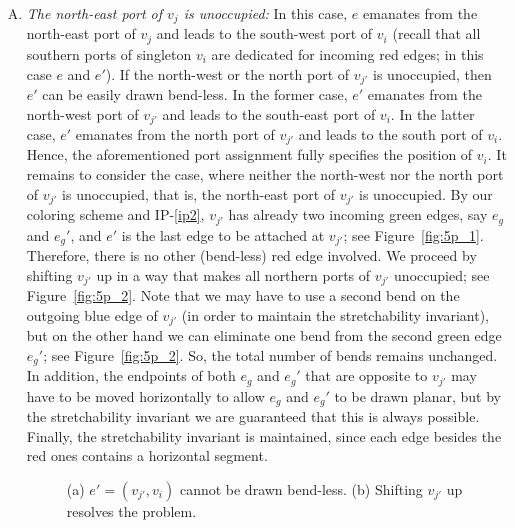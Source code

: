 \documentclass[a4paper,twoside,11pt]{article}
\begin{document}
\begin{enumerate}[C.1:] 
  
\item \label{c1} \emph{The north-east port of $v_j$ is unoccupied:}
In this case, $e$ emanates from the north-east port of $v_j$ and
leads to the south-west port of $v_i$ (recall that all southern
ports of singleton $v_i$ are dedicated for incoming red edges; in
this case $e$ and $e'$). If the north-west or the north port of
$v_{j'}$ is unoccupied, then $e'$ can be easily drawn bend-less. In
the former case, $e'$ emanates from the north-west port of $v_{j'}$
and leads to the south-east port of $v_i$. In the latter case, $e'$
emanates from the north port of $v_{j'}$ and leads to the south port
of $v_i$. Hence, the aforementioned port assignment fully specifies
the position of $v_i$. It remains to consider the case, where
neither the north-west nor the north port of $v_{j'}$ is unoccupied,
that is, the north-east port of $v_{j'}$ is unoccupied. By our
coloring scheme and IP-\ref{ip2}, $v_{j'}$ has already two incoming
green edges, say $e_g$ and $e_g'$, and $e'$ is the last edge to be
attached at $v_{j'}$; see Figure~\ref{fig:5p_1}. Therefore, there is
no other (bend-less) red edge involved. We proceed by shifting
$v_{j'}$ up in a way that makes all northern ports of $v_{j'}$
unoccupied; see Figure~\ref{fig:5p_2}. Note that we may have to use
a second bend on the outgoing blue edge of $v_{j'}$ (in order to
maintain the stretchability invariant), but on the other hand we can
eliminate one bend from the second green edge $e_g'$; see
Figure~\ref{fig:5p_2}. So, the total number of bends remains
unchanged. In addition, the endpoints of both $e_g$ and $e_g'$ that
are opposite to $v_{j'}$ may have to be moved horizontally to allow
$e_g$ and $e_g'$ to be drawn planar, but by the stretchability
invariant we are guaranteed that this is always possible. Finally,
the stretchability invariant is maintained, since each edge besides
the red ones contains a horizontal segment.

\begin{figure}[t!]
    \centering 
    \begin{minipage}[b]{.18\textwidth}
        \centering
    \end{minipage}
    \hfil
    \begin{minipage}[b]{.22\textwidth}
        \centering
    \end{minipage}
    \caption{ 
    (a) $e'=(v_{j'},v_i)$ cannot be drawn bend-less.
    (b) Shifting $v_{j'}$ up resolves the problem.}
    \label{fig:5p} 
\end{figure}


\end{enumerate}
\end{document}
